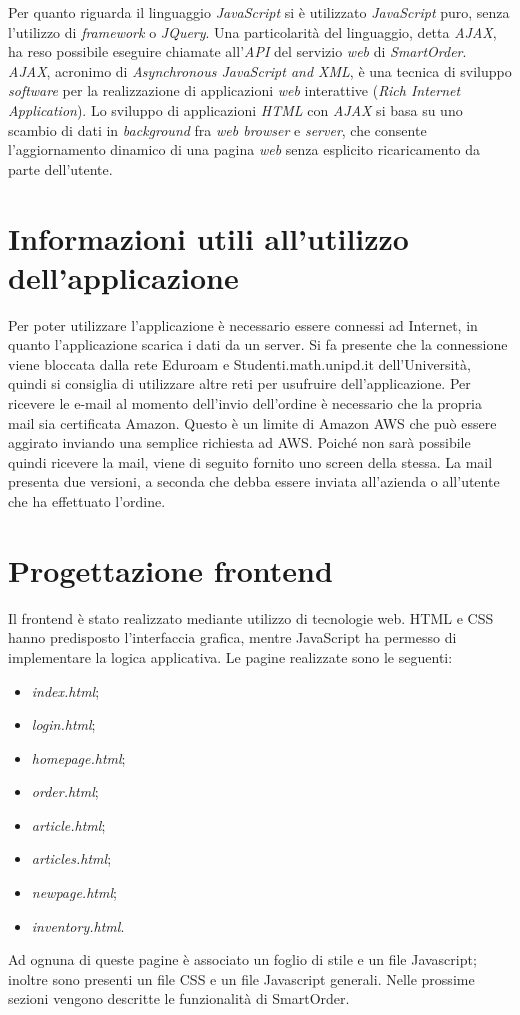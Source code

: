 \documentclass[12pt, a4paper, titlepage]{report}
\begin{document}
	Per quanto riguarda il linguaggio \textit{JavaScript} si è utilizzato \textit{JavaScript} puro, senza l'utilizzo di \textit{framework} o \textit{JQuery}. Una particolarità del linguaggio, detta \textit{AJAX}, ha reso possibile eseguire chiamate all'\textit{API} del servizio \textit{web} di \textit{SmartOrder}. \textit{AJAX}, acronimo di \textit{\textit{Asynchronous JavaScript and XML}}, è una tecnica di sviluppo \textit{software} per la realizzazione di applicazioni \textit{web} interattive (\textit{Rich Internet Application}). Lo sviluppo di applicazioni \textit{HTML} con \textit{AJAX} si basa su uno scambio di dati in \textit{background} fra \textit{web browser} e \textit{server}, che consente l'aggiornamento dinamico di una pagina \textit{web} senza esplicito ricaricamento da parte dell'utente.
	
	\section{Informazioni utili all'utilizzo dell'applicazione}
	
	Per poter utilizzare l'applicazione è necessario essere connessi ad Internet, in quanto l'applicazione scarica i dati da un server. Si fa presente che la connessione viene bloccata dalla rete Eduroam e Studenti.math.unipd.it dell'Università, quindi si consiglia di utilizzare altre reti per usufruire dell'applicazione. Per ricevere le e-mail al momento dell'invio dell'ordine è necessario che la propria mail sia certificata Amazon. Questo è un limite di Amazon AWS che può essere aggirato inviando una semplice richiesta ad AWS. Poiché non sarà possibile quindi ricevere la mail, viene di seguito fornito uno screen della stessa. La mail presenta due versioni, a seconda che debba essere inviata all'azienda o all'utente che ha effettuato l'ordine.
	
	\section{Progettazione frontend}
	
	Il frontend è stato realizzato mediante utilizzo di tecnologie web. HTML e CSS hanno predisposto l'interfaccia grafica, mentre JavaScript ha permesso di implementare la logica applicativa.
	Le pagine realizzate sono le seguenti:
	\begin{itemize}
		\item \textit{index.html};
		\item \textit{login.html};
		\item \textit{homepage.html};
		\item \textit{order.html};
		\item \textit{article.html};
		\item \textit{articles.html};
		\item \textit{newpage.html};
		\item \textit{inventory.html}.
	\end{itemize}
	Ad ognuna di queste pagine è associato un foglio di stile e un file Javascript; inoltre sono presenti un file CSS e un file Javascript generali. Nelle prossime sezioni vengono descritte le funzionalità di SmartOrder.
	
\end{document}
